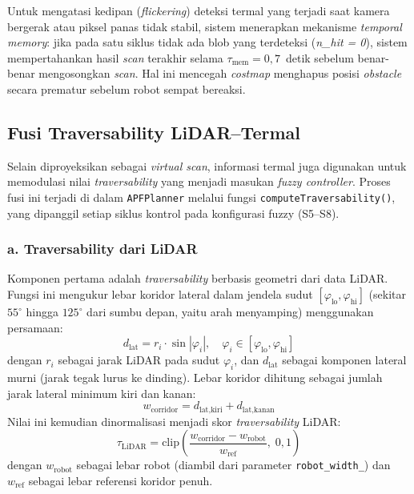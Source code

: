 Untuk mengatasi kedipan (\textit{flickering}) deteksi termal yang terjadi saat kamera bergerak atau piksel panas tidak stabil, sistem menerapkan mekanisme \textit{temporal memory}: jika pada satu siklus tidak ada blob yang terdeteksi (\textit{n\_hit = 0}), sistem mempertahankan hasil \textit{scan} terakhir selama $\tau_\text{mem} = 0{,}7$~detik sebelum benar-benar mengosongkan \textit{scan}. Hal ini mencegah \textit{costmap} menghapus posisi \textit{obstacle} secara prematur sebelum robot sempat bereaksi.

\subsection{Fusi Traversability LiDAR--Termal}
\label{sec:fusi_trav}

Selain diproyeksikan sebagai \textit{virtual scan}, informasi termal juga digunakan untuk memodulasi nilai \textit{traversability} yang menjadi masukan \textit{fuzzy controller}. Proses fusi ini terjadi di dalam \texttt{APFPlanner} melalui fungsi \texttt{computeTraversability()}, yang dipanggil setiap siklus kontrol pada konfigurasi fuzzy (S5--S8).

\subsubsection*{a. Traversability dari LiDAR}

Komponen pertama adalah \textit{traversability} berbasis geometri dari data LiDAR. Fungsi ini mengukur lebar koridor lateral dalam jendela sudut $[\varphi_\text{lo}, \varphi_\text{hi}]$ (sekitar $55^\circ$ hingga $125^\circ$ dari sumbu depan, yaitu arah menyamping) menggunakan persamaan:
\begin{equation}
    d_\text{lat} = r_i \cdot \sin|\varphi_i|, \quad
    \varphi_i \in [\varphi_\text{lo}, \varphi_\text{hi}]
    \label{eq:lateral_dist}
\end{equation}
dengan $r_i$ sebagai jarak LiDAR pada sudut $\varphi_i$, dan $d_\text{lat}$ sebagai komponen lateral murni (jarak tegak lurus ke dinding). Lebar koridor dihitung sebagai jumlah jarak lateral minimum kiri dan kanan:
\begin{equation}
    w_\text{corridor} = d_\text{lat,kiri} + d_\text{lat,kanan}
    \label{eq:corridor_lidar}
\end{equation}
Nilai ini kemudian dinormalisasi menjadi skor \textit{traversability} LiDAR:
\begin{equation}
    \tau_\text{LiDAR} = \mathrm{clip}\!\left(\frac{w_\text{corridor} - w_\text{robot}}{w_\text{ref}},\; 0, 1\right)
    \label{eq:trav_lidar_blindspot}
\end{equation}
dengan $w_\text{robot}$ sebagai lebar robot (diambil dari parameter \texttt{robot\_width\_}) dan $w_\text{ref}$ sebagai lebar referensi koridor penuh.

